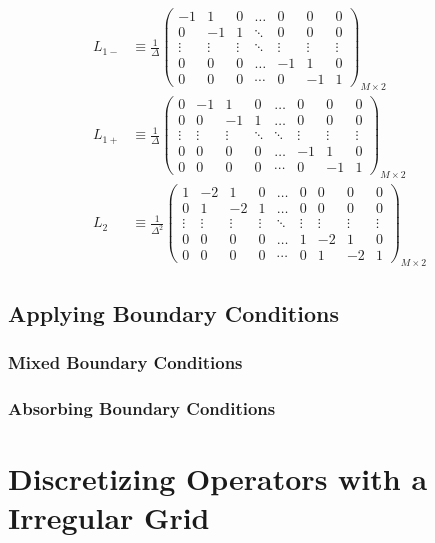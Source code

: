 \documentclass[11pt]{article}
\theoremstyle{definition}
\begin{document}
\begin{align}
L_{1-} &\equiv \frac{1}{\Delta}\begin{pmatrix}
-1 &1 &0&\dots&0&0&0\\
0&-1&1&\ddots&0&0&0\\
\vdots&\vdots&\vdots&\ddots&\vdots&\vdots&\vdots\\
0&0&0&\dots&-1&1&0\\
0&0&0&\cdots&0&-1&1
\end{pmatrix}_{M\times 2}\label{eq:L-1-extended-regular} \\
L_{1+} &\equiv \frac{1}{\Delta}\begin{pmatrix}
0&-1&1&0&\dots&0&0&0\\
0&0&-1&1&\dots&0&0&0\\
\vdots&\vdots&\vdots&\ddots&\ddots&\vdots&\vdots&\vdots\\
0&0&0&0&\dots&-1&1&0\\
0&0&0&0&\cdots&0&-1&1
\end{pmatrix}_{M\times 2}\label{eq:L-1-plus-extended-regular} \\
L_2 &\equiv \frac{1}{\Delta^2}\begin{pmatrix}
1&-2  &1&0&\dots&0&0&0&0\\
0&1&-2&1&\dots&0&0&0&0\\
\vdots&\vdots&\vdots&\vdots&\ddots&\vdots&\vdots&\vdots&\vdots\\
0&0&0&0&\dots&1&-2&1&0\\
0&0&0&0&\cdots&0&1&-2 &1
\end{pmatrix}_{M\times 2}\label{eq:L-2-extended-regular}
\end{align}


\subsection{Applying Boundary Conditions}
\subsubsection{Mixed Boundary Conditions}
\subsubsection{Absorbing Boundary Conditions}




\section{Discretizing Operators with a Irregular Grid}
\end{document}
